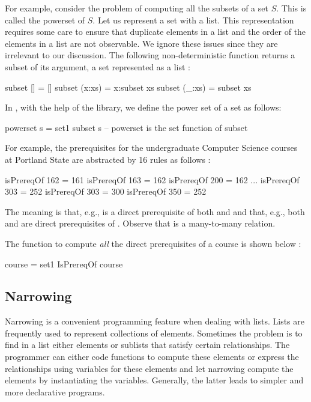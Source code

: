 For example, consider the problem of computing all the subsets
of a set $S$.  This is called the powerset of $S$. 
Let us represent a set with a list.
This representation requires some care to ensure that
duplicate elements in a list and
the order of the elements in a list are not observable.
We ignore these issues since they are irrelevant to our discussion.
The following non-deterministic function returns a
subset of its argument, a set represented as a list
:
%
\begin{prog}
subset []     = []
subset (x:xs) = x:subset xs
subset (_:xs) =   subset xs
\end{prog}
%
In \pakcs{}, with the help of the  library,
we define the power set of a set as follows:
%
\begin{prog}
powerset s = set1 subset s  -- powerset is the set function of subset
\end{prog}
%
For example, the prerequisites for the undergraduate 
Computer Science courses at Portland State
are abstracted by 16 rules as follows
:
%
\begin{prog}
isPrereqOf 162 = 161
isPrereqOf 163 = 162
isPrereqOf 200 = 162
...
isPrereqOf 303 = 252
isPrereqOf 303 = 300
isPrereqOf 350 = 252
\end{prog}
%
The meaning is that, e.g.,  is a direct prerequisite of both
 and  and that, e.g., 
both  and  are direct prerequisites of .
Observe that  is a many-to-many relation.

The function to compute \emph{all} the direct prerequisites
of a course is shown below
:
%
\begin{prog}
 course = set1 IsPrereqOf course
\end{prog}
%


\subsection{Narrowing}

Narrowing is a convenient programming feature when dealing with lists.
Lists are frequently used to represent collections of elements.
Sometimes the problem is to find in a list either elements
or sublists that satisfy certain relationships.
The programmer can either code functions to compute these elements
or express the relationships using variables for these elements
and let narrowing compute the elements by instantiating the variables.
Generally, the latter leads to simpler and more declarative programs.


